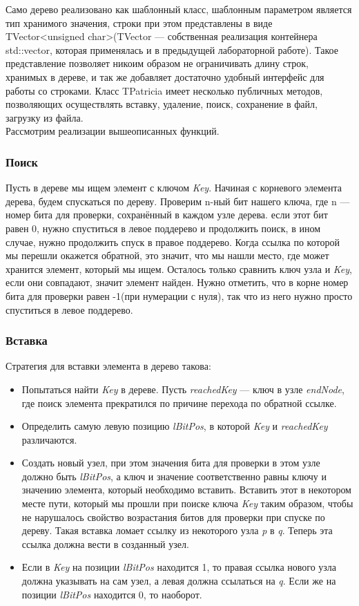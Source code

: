 Само дерево реализовано как шаблонный класс, шаблонным параметром является тип хранимого значения, строки при этом представлены в виде TVector<unsigned char>(TVector --- собственная реализация контейнера std::vector, которая применялась и в предыдущей лабораторной работе). Такое представление позволяет никоим образом не ограничивать длину строк, хранимых в дереве, и так же добавляет достаточно удобный интерфейс для работы со строками. Класс TPatricia имеет несколько публичных методов, позволяющих осуществлять вставку, удаление, поиск, сохранение в файл, загрузку из файла.\\
Рассмотрим реализации вышеописанных функций.
\subsubsection{Поиск} 
Пусть в дереве мы ищем элемент с ключом \textit{Key}. Начиная с корневого элемента дерева, будем спускаться по дереву. Проверим n-ный бит нашего ключа, где n --- номер бита для проверки, сохранённый в каждом узле дерева. если этот бит равен 0, нужно спуститься в левое поддерево и продолжить поиск, в ином случае, нужно продолжить спуск в правое поддерево. Когда ссылка по которой мы перешли окажется обратной, это значит, что мы нашли место, где может хранится элемент, который мы ищем. Осталось только сравнить ключ узла и \textit{Key}, если они совпадают, значит элемент найден. Нужно отметить, что в корне номер бита для проверки равен -1(при нумерации с нуля), так что из него нужно просто спуститься в левое поддерево.\\
\subsubsection{Вставка}
 Стратегия для вставки элемента в дерево такова:
\begin{itemize}
  \item Попытаться найти \textit{Key} в дереве. Пусть \textit{reachedKey} --- ключ в узле \textit{endNode}, где поиск элемента прекратился по причине перехода по обратной ссылке.
  \item Определить самую левую позицию \textit{lBitPos}, в которой \textit{Key} и \textit{reachedKey} различаются.
  \item Создать новый узел, при этом значения бита для проверки в этом узле должно быть \textit{lBitPos}, а ключ и значение соответственно равны ключу и значению элемента, который необходимо вставить. Вставить этот в некотором месте пути, который мы прошли при поиске ключа \textit{Key} таким образом, чтобы не нарушалось свойство возрастания битов для проверки при спуске по дереву. Такая вставка ломает ссылку из некоторого узла \textit{p} в \textit{q}. Теперь эта ссылка должна вести в созданный узел.
\item Если в \textit{Key} на позиции \textit{lBitPos} находится 1, то правая ссылка нового узла должна указывать на сам узел, а левая должна ссылаться на  \textit{q}. Если же на позиции \textit{lBitPos} находится 0, то наоборот.
\end{itemize}
